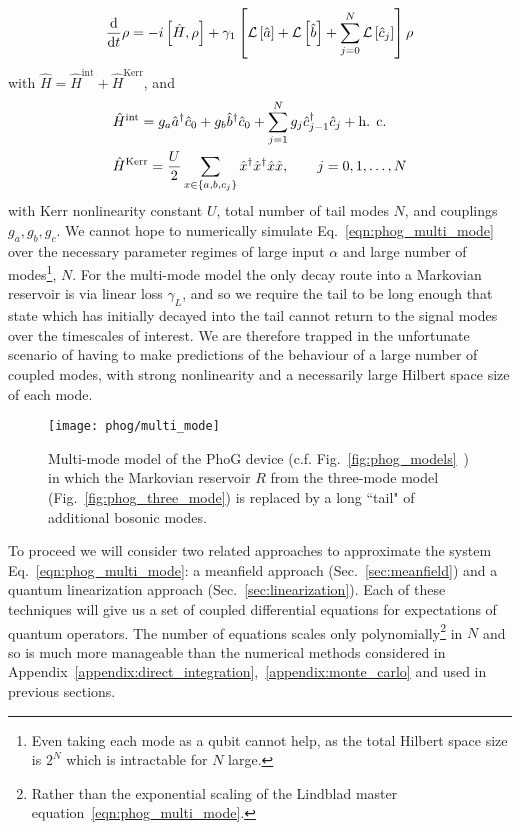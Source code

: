 \begin{equation}\label{eqn:phog_multi_mode}
\frac{\mathrm{d}}{\mathrm{d}t} \rho = - i \left[\hat{H}, \rho\right] + \gamma_1 \left[\mathcal{L}\left[\hat{a}\right] + \mathcal{L}\left[\hat{b}\right] + \sum_{j=0}^N \mathcal{L}\left[\hat{c}_j\right] \right] \rho
\end{equation}
with $\hat{H} = \hat{H}^{\text{int}} + \hat{H}^{\text{Kerr}}$, and
\begin{align}
&\hat{H}^{\text{int}} = g_a \hat{a}^\dagger \hat{c}_0 + g_b \hat{b}^\dagger \hat{c}_0 + \sum_{j=1}^N g_j \hat{c}_{j-1}^\dagger \hat{c}_j + \hc \notag \\
%
&\hat{H}^{\text{Kerr}} = \frac{U}{2} \sum_{x \in \left\{a, b, c_j\right\}} \hat{x}^\dagger \hat{x}^\dagger \hat{x} \hat{x}, \qq{} j = 0, 1, \dots, N
\end{align}
with Kerr nonlinearity constant $U$, total number of tail modes $N$, and couplings $g_a, g_b, g_c$. We cannot hope to numerically simulate Eq.~\ref{eqn:phog_multi_mode} over the necessary parameter regimes of large input $\alpha$ and large number of modes\footnote{Even taking each mode as a qubit cannot help, as the total Hilbert space size is $2^{N}$ which is intractable for $N$ large.}, $N$. For the multi-mode model the only decay route into a Markovian reservoir is via linear loss $\gamma_L$, and so we require the tail to be long enough that state which has initially decayed into the tail cannot return to the signal modes over the timescales of interest. We are therefore trapped in the unfortunate scenario of having to make predictions of the behaviour of a large number of coupled modes, with strong nonlinearity and a necessarily large Hilbert space size of each mode. 

\begin{figure}[htp]
\centering
\texttt{[image: phog/multi\_mode]}
\caption{\label{fig:phog_multi_mode} Multi-mode model of the PhoG device (c.f. Fig.~\ref{fig:phog_models}~\MakeUppercase{}) in which the Markovian reservoir $R$ from the three-mode model (Fig.~\ref{fig:phog_three_mode}) is replaced by a long ``tail" of additional bosonic modes.}
\end{figure}

To proceed we will consider two related approaches to approximate the system Eq.~\ref{eqn:phog_multi_mode}: a meanfield approach (Sec.~\ref{sec:meanfield}) and a quantum linearization approach (Sec.~\ref{sec:linearization}). Each of these techniques will give us a set of coupled differential equations for expectations of quantum operators. The number of equations scales only polynomially\footnote{Rather than the exponential scaling of the Lindblad master equation~\ref{eqn:phog_multi_mode}.} in $N$ and so is much more manageable than the numerical methods considered in Appendix~\ref{appendix:direct_integration},~\ref{appendix:monte_carlo} and used in previous sections.

